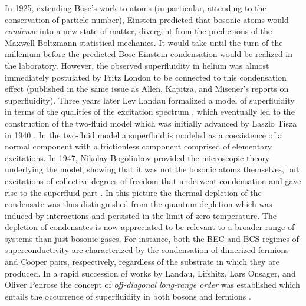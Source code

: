 	In 1925, extending Bose's work to atoms (in particular, attending to the conservation of particle number), Einstein predicted \cite{Einstein25} that bosonic atoms would \emph{condense} into a new state of matter, divergent from the predictions of the Maxwell-Boltzmann statistical mechanics. 	
	It would take until the turn of the millenium before the predicted Bose-Einstein condensation would be realized in the laboratory.
	However, the observed superfluidity in helium was almost immediately postulated by Fritz London to be connected to this condensation effect \cite{London38} (published in the same issue as Allen, Kapitza, and Misener's reports on superfluidity).
	Three years later Lev Landau formalized a model of superfluidity in terms of the qualities of the excitation spectrum \cite{Landau41}, which eventually led to the construction of the two-fluid model which was initially advanced by Laszlo Tisza in 1940 \cite{TiszaXX}.
	In the two-fluid model a superfluid is modeled as a coexistence of a normal component with a frictionless component comprised of elementary excitations.
	In 1947, Nikolay Bogoliubov provided the microscopic theory underlying the model, showing that it was not the bosonic atoms themselves, but excitations of collective degrees of freedom that underwent condensation and gave rise to the superfluid part \cite{Bogolubov47}.
	In this picture the thermal depletion of the condensate was thus distinguished from the quantum depletion which was induced by interactions and persisted in the limit of zero temperature.
	The depletion of condensates is now appreciated to be relevant to a broader range of systems than just bosonic gases.
	For instance, both the BEC and BCS regimes of superconductivity are characterized by the condensation of dimerized fermions and Cooper pairs, respectively, regardless of the substrate in which they are produced.
	In a rapid succession of works by Landau, Lifshitz, Lars Onsager, and Oliver Penrose \cite{Landau51,Penrose51,Penrose56}  the concept of \emph{off-diagonal long-range order} was established which entails the occurrence of superfluidity in both bosons and fermions \cite{PitaevskiiStringari}.
	
